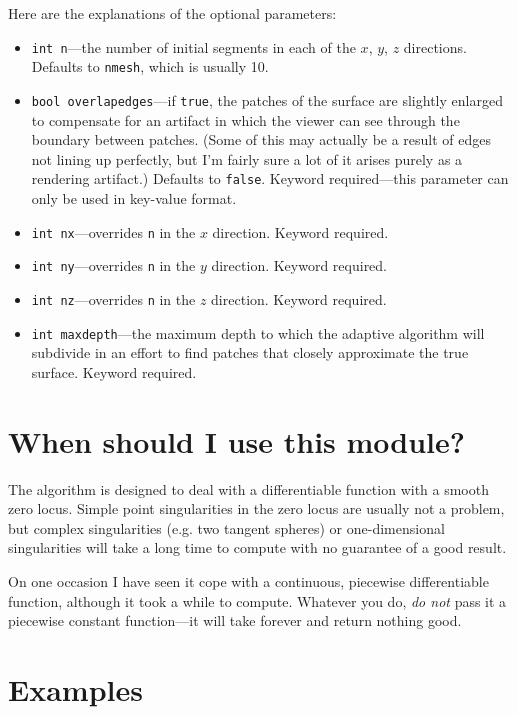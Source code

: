 \documentclass{article}
\begin{document}
Here are the explanations of the optional parameters:
\begin{itemize}
\item \lstinline!int n!---the number of initial segments in each of the 
$x$, $y$, $z$ directions. Defaults to \lstinline!nmesh!, which is usually 10.
\item \lstinline!bool overlapedges!---if \lstinline!true!, the patches of the surface are slightly enlarged to compensate for an artifact in which the viewer can see through the boundary between patches. (Some of this may actually be a result of edges not lining up perfectly, but I'm fairly sure a lot of it arises purely as a rendering artifact.) Defaults to \lstinline!false!. Keyword required---this parameter
can only be used in key-value format.
\item \lstinline!int nx!---overrides \lstinline!n! in the $x$ direction. 
Keyword required.
\item \lstinline!int ny!---overrides \lstinline!n! in the $y$ direction. 
Keyword required.
\item \lstinline!int nz!---overrides \lstinline!n! in the $z$ direction. 
Keyword required.
\item \lstinline!int maxdepth!---the maximum depth to which the adaptive algorithm will subdivide in an effort to find patches that closely approximate the true surface.  Keyword required.
\end{itemize}

\section{When should I use this module?}
The algorithm is designed to deal with a differentiable function with a smooth zero 
locus. Simple point singularities in the zero locus are usually not a problem,
but complex singularities (e.g. two tangent spheres) or one-dimensional 
singularities will take a long time to compute with no guarantee of a 
good result.
 
On one occasion I have seen it cope with a continuous, piecewise differentiable function, although it took a while to compute. Whatever you do, \emph{do not} 
pass it a piecewise constant function---it will take forever and return nothing good.

\section{Examples}
\end{document}
